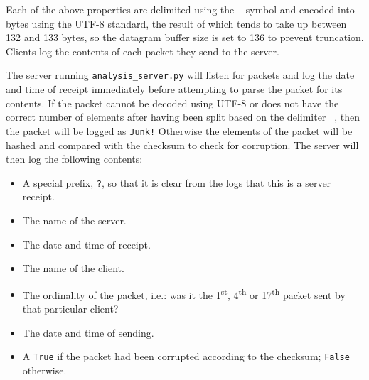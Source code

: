 Each of the above properties are delimited using the \texttt{~} symbol and encoded into bytes using the UTF-8
standard\cite{utf8}, the result of which tends to take up between 132 and 133 bytes, so the datagram buffer size is
set to 136 to prevent truncation. Clients log the contents of each packet they send to the server.

The server running \texttt{analysis\_server.py} will listen for packets and log the date and time of receipt
immediately before attempting to parse the packet for its contents. If the packet cannot be decoded using UTF-8 or
does not have the correct number of elements after having been split based on the delimiter \texttt{~}, then the
packet will be logged as \texttt{Junk!} Otherwise the elements of the packet will be hashed and compared with the
checksum to check for corruption. The server will then log the following contents:
\begin{itemize}
    \item A special prefix, \texttt{?}, so that it is clear from the logs that this is a server receipt.
    \item The name of the server.
    \item The date and time of receipt.
    \item The name of the client.
    \item The ordinality of the packet, i.e.: was it the 1\textsuperscript{st}, 4\textsuperscript{th} or
    17\textsuperscript{th} packet sent by that particular client?
    \item The date and time of sending.
    \item A \texttt{True} if the packet had been corrupted according to the checksum; \texttt{False} otherwise.
\end{itemize}

